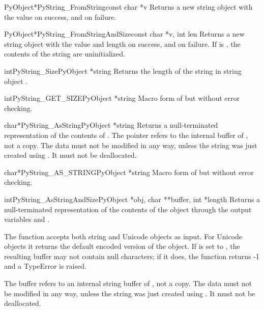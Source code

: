 \documentclass{manual}
\begin{document}
\begin{cfuncdesc}{PyObject*}{PyString_FromString}{const char *v}
Returns a new string object with the value  on success, and
\NULL{} on failure.
\end{cfuncdesc}

\begin{cfuncdesc}{PyObject*}{PyString_FromStringAndSize}{const char *v,
                                                         int len}
Returns a new string object with the value  and length
 on success, and \NULL{} on failure.  If  is \NULL{},
the contents of the string are uninitialized.
\end{cfuncdesc}

\begin{cfuncdesc}{int}{PyString_Size}{PyObject *string}
Returns the length of the string in string object .
\end{cfuncdesc}

\begin{cfuncdesc}{int}{PyString_GET_SIZE}{PyObject *string}
Macro form of  but without error
checking.
\end{cfuncdesc}

\begin{cfuncdesc}{char*}{PyString_AsString}{PyObject *string}
Returns a null-terminated representation of the contents of
.  The pointer refers to the internal buffer of
, not a copy.  The data must not be modified in any way,
unless the string was just created using
.
It must not be deallocated.
\end{cfuncdesc}

\begin{cfuncdesc}{char*}{PyString_AS_STRING}{PyObject *string}
Macro form of  but without error
checking.
\end{cfuncdesc}

\begin{cfuncdesc}{int}{PyString_AsStringAndSize}{PyObject *obj,
                                                 char **buffer,
                                                 int *length}
Returns a null-terminated representation of the contents of the object
 through the output variables  and .

The function accepts both string and Unicode objects as input. For
Unicode objects it returns the default encoded version of the object.
If  is set to \NULL{}, the resulting buffer may not contain
null characters; if it does, the function returns -1 and a
TypeError is raised.

The buffer refers to an internal string buffer of , not a
copy. The data must not be modified in any way, unless the string was
just created using .  It must not be deallocated.
\end{cfuncdesc}
\end{document}
